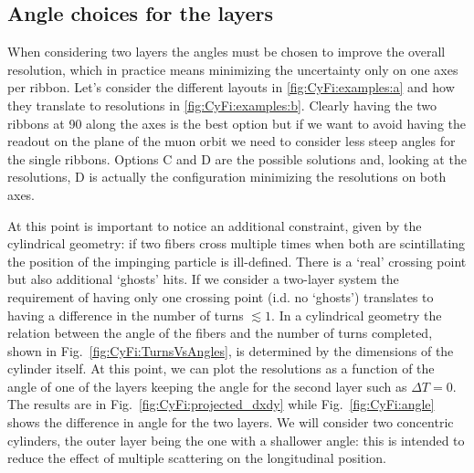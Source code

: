 \begin{refsection}
\subsection{Angle choices for the layers}
When considering two layers the angles must be chosen to improve the overall resolution, which in practice means minimizing the uncertainty only on one axes per ribbon.
Let's consider the different layouts in \ref{fig:CyFi:examples:a} and how they translate to resolutions in \ref{fig:CyFi:examples:b}.
Clearly having the two ribbons at \SI{90}{\deg} along the axes is the best option but if we want to avoid having the readout on the plane of the muon orbit we need to consider less steep angles for the single ribbons.
Options C and D are the possible solutions and, looking at the resolutions, D is actually the configuration minimizing the resolutions on both axes. 

\noindent
At this point is important to notice an additional constraint, given by the cylindrical geometry: if two fibers cross multiple times when both are scintillating the position of the impinging particle is ill-defined. There is a `real' crossing point but also additional `ghosts' hits.
If we consider a two-layer system the requirement of having only one crossing point (i.d. no `ghosts') translates to having a difference in the number of turns $\lesssim1$. 
In a cylindrical geometry the relation between the angle of the fibers and the number of turns completed, shown in Fig.~\ref{fig:CyFi:TurnsVsAngles}, is determined by the dimensions of the cylinder itself.
At this point, we can plot the resolutions as a function of the angle of one of the layers keeping the angle for the second layer such as $\Delta T=0$. The results are in Fig.~\ref{fig:CyFi:projected_dxdy} while Fig.~\ref{fig:CyFi:angle} shows the difference in angle for the two layers.
We will consider two concentric cylinders, the outer layer being the one with a shallower angle: this is intended to reduce the effect of multiple scattering on the longitudinal position.


\end{refsection}
